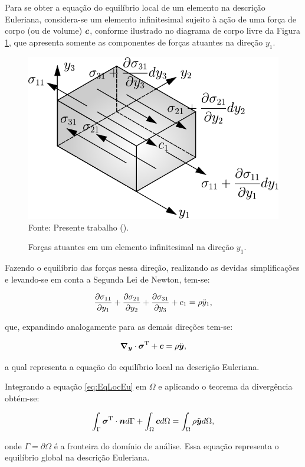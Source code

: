 Para se obter a equação do equilíbrio local de um elemento na descrição Euleriana, considera-se um elemento infinitesimal sujeito à ação de uma força de corpo (ou de volume) $\boldsymbol{c}$, conforme ilustrado no diagrama de corpo livre da Figura \ref{fig:CorpoLivreSolido}, que apresenta somente as componentes de forças atuantes na direção $y_1$.

\begin{figure}[h!]
    \centering
    \caption{Forças atuantes em um elemento infinitesimal na direção $y_1$.}
    \includegraphics[width=.5\linewidth]{Figuras/CorpoLivreSolido.pdf}
    \\Fonte: Presente trabalho (\the\year).
    \label{fig:CorpoLivreSolido}
\end{figure}

Fazendo o equilíbrio das forças nessa direção, realizando as devidas simplificações e levando-se em conta a Segunda Lei de Newton, tem-se:

\[\frac{\partial{\sigma_{11}}}{\partial{y_1}}+\frac{\partial{\sigma_{21}}}{\partial{y_2}}+\frac{\partial{\sigma_{31}}}{\partial{y_3}}+c_1=\rho\ddot{y}_1\text{,}\]

\noindent que, expandindo analogamente para as demais direções tem-se:

\begin{equation}
    \boldsymbol{\nabla_y}\cdot\boldsymbol{\sigma}^\mathrm{T}+\boldsymbol{c}=\rho\ddot{\boldsymbol{y}}\text{,}
    \label{eq:EqLocEu}
\end{equation}

\noindent a qual representa a equação do equilíbrio local  na descrição Euleriana.

Integrando a equação \eqref{eq:EqLocEu} em $\Omega$ e aplicando o teorema da divergência obtém-se:

\begin{equation}
    \int_\Gamma{\boldsymbol{\sigma}^\mathrm{T}\cdot\boldsymbol{n}d\Gamma}+\int_\Omega{\boldsymbol{c}d\Omega}=\int_\Omega{\rho\ddot{\boldsymbol{y}}d\Omega}
    \text{,}
    \label{eq:EqGlobEu}
\end{equation}

\noindent onde $\Gamma=\partial\Omega$ é a fronteira do domínio de análise. Essa equação representa o equilíbrio global na descrição Euleriana.

